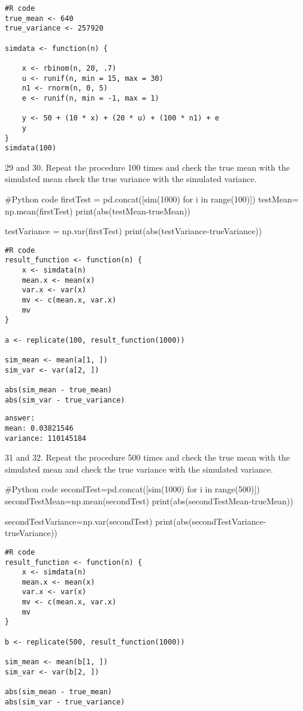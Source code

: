 \documentclass{article}
\begin{document}
\begin{verbatim}
#R code
true_mean <- 640
true_variance <- 257920

simdata <- function(n) {

    x <- rbinom(n, 20, .7)
    u <- runif(n, min = 15, max = 30)
    n1 <- rnorm(n, 0, 5)
    e <- runif(n, min = -1, max = 1)

    y <- 50 + (10 * x) + (20 * u) + (100 * n1) + e
    y
}
simdata(100)
\end{verbatim}

29 and 30.	Repeat the procedure 100 times and check the true mean with the simulated mean check the true variance with the simulated variance.
\begin{pythoncode}
#Python code
firstTest = pd.concat([sim(1000) for i in range(100)])
testMean= np.mean(firstTest)
print(abs(testMean-trueMean))

testVariance = np.var(firstTest)
print(abs(testVariance-trueVariance))
\end{pythoncode}

\begin{verbatim}
#R code
result_function <- function(n) {
    x <- simdata(n)
    mean.x <- mean(x)
    var.x <- var(x)
    mv <- c(mean.x, var.x)
    mv
}

a <- replicate(100, result_function(1000))

sim_mean <- mean(a[1, ])
sim_var <- var(a[2, ])

abs(sim_mean - true_mean)
abs(sim_var - true_variance)
\end{verbatim}

\begin{verbatim}
answer: 
mean: 0.03821546
variance: 110145184
\end{verbatim}


31 and 32.	Repeat the procedure 500 times and check the true mean with the simulated mean and check the true variance with the simulated variance.
\begin{pythoncode}
#Python code
secondTest=pd.concat([sim(1000) for i in range(500)])
secondTestMean=np.mean(secondTest)
print(abs(secondTestMean-trueMean))

secondTestVariance=np.var(secondTest)
print(abs(secondTestVariance-trueVariance))
\end{pythoncode}

\begin{verbatim}
#R code
result_function <- function(n) {
    x <- simdata(n)
    mean.x <- mean(x)
    var.x <- var(x)
    mv <- c(mean.x, var.x)
    mv
}

b <- replicate(500, result_function(1000))

sim_mean <- mean(b[1, ])
sim_var <- var(b[2, ])

abs(sim_mean - true_mean)
abs(sim_var - true_variance)
\end{verbatim}
\end{document}
